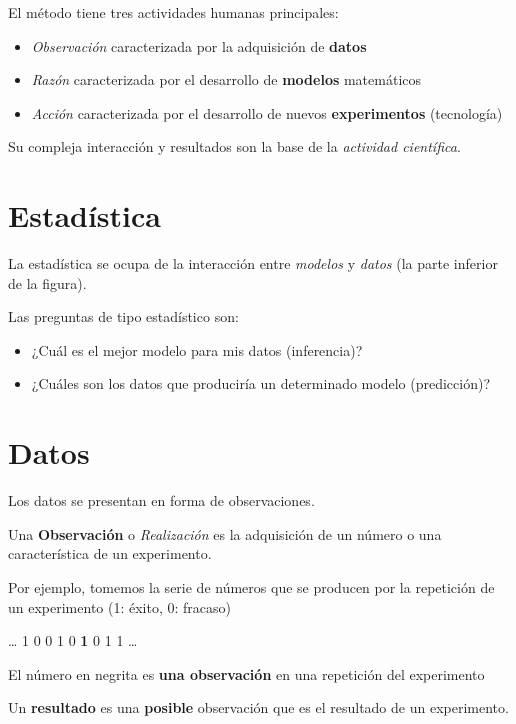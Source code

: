 \documentclass[
]{book}
\providecommand{\tightlist}{%
  \setlength{\itemsep}{0pt}\setlength{\parskip}{0pt}}
\begin{document}
El método tiene tres actividades humanas principales:

\begin{itemize}
\tightlist
\item
  \emph{Observación} caracterizada por la adquisición de \textbf{datos}
\item
  \emph{Razón} caracterizada por el desarrollo de \textbf{modelos} matemáticos
\item
  \emph{Acción} caracterizada por el desarrollo de nuevos \textbf{experimentos} (tecnología)
\end{itemize}

Su compleja interacción y resultados son la base de la \emph{actividad científica}.

\hypertarget{estaduxedstica}{%
\section{Estadística}\label{estaduxedstica}}

La estadística se ocupa de la interacción entre \emph{modelos} y \emph{datos} (la parte inferior de la figura).

Las preguntas de tipo estadístico son:

\begin{itemize}
\tightlist
\item
  ¿Cuál es el mejor modelo para mis datos (inferencia)?
\item
  ¿Cuáles son los datos que produciría un determinado modelo (predicción)?
\end{itemize}

\hypertarget{datos}{%
\section{Datos}\label{datos}}

Los datos se presentan en forma de observaciones.

Una \textbf{Observación} o \emph{Realización} es la adquisición de un número o una característica de un experimento.

Por ejemplo, tomemos la serie de números que se producen por la repetición de un experimento (1: éxito, 0: fracaso)

\ldots{} 1 0 0 1 0 \textbf{1} 0 1 1 \ldots{}

El número en negrita es \textbf{una observación} en una repetición del experimento

Un \textbf{resultado} es una \textbf{posible} observación que es el resultado de un experimento.
\end{document}

